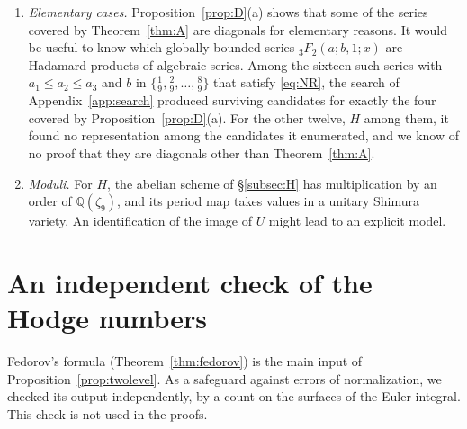 \documentclass[11pt]{amsart}
\theoremstyle{definition}
\theoremstyle{remark}
\numberwithin{equation}{section}
\newcommand{\Q}{\mathbb{Q}}
\begin{document}
\begin{enumerate}[label=(\arabic*),leftmargin=2em]
\item \emph{Elementary cases.} Proposition~\ref{prop:D}(a) shows that some of the series covered by Theorem~\ref{thm:A} are diagonals for elementary reasons. It would be useful to know which globally bounded series ${}_3F_2(a;b,1;x)$ are Hadamard products of algebraic series. Among the sixteen such series with $a_1\le a_2\le a_3$ and $b$ in $\{\frac19,\frac29,\dots,\frac89\}$ that satisfy \eqref{eq:NR}, the search of Appendix~\ref{app:search} produced surviving candidates for exactly the four covered by Proposition~\ref{prop:D}(a). For the other twelve, $H$ among them, it found no representation among the candidates it enumerated, and we know of no proof that they are diagonals other than Theorem~\ref{thm:A}.
\item \emph{Moduli.} For $H$, the abelian scheme of \S\ref{subsec:H} has multiplication by an order of $\Q(\zeta_9)$, and its period map takes values in a unitary Shimura variety. An identification of the image of $U$ might lead to an explicit model.
\end{enumerate}

\appendix
\section{An independent check of the Hodge numbers}\label{app:euler}

Fedorov's formula (Theorem~\ref{thm:fedorov}) is the main input of Proposition~\ref{prop:twolevel}. As a safeguard against errors of normalization, we checked its output independently, by a count on the surfaces of the Euler integral. This check is not used in the proofs.
\end{document}
